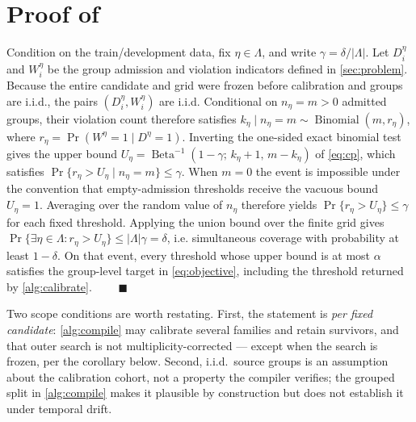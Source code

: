 \section{Proof of \texorpdfstring{}{Proposition 1}}
\label{app:proof}

Condition on the train/development data, fix $\eta\in\Lambda$, and write
$\gamma=\delta/|\Lambda|$. Let $D_i^\eta$ and $W_i^\eta$ be the group admission
and violation indicators defined in \cref{sec:problem}. Because the entire
candidate and grid were frozen before calibration and groups are i.i.d., the
pairs $(D_i^\eta,W_i^\eta)$ are i.i.d. Conditional on $n_\eta=m>0$ admitted
groups, their violation count therefore satisfies
$k_\eta\mid n_\eta=m\sim\operatorname{Binomial}(m,r_\eta)$, where
$r_\eta=\Pr(W^\eta=1\mid D^\eta=1)$. Inverting the one-sided exact binomial
test~\citep{clopper1934binomial} gives the upper bound
$U_\eta=\operatorname{Beta}^{-1}(1-\gamma;\,k_\eta+1,\,m-k_\eta)$ of
\cref{eq:cp}, which satisfies
$\Pr\{r_\eta > U_\eta \mid n_\eta=m\}\le\gamma$. When $m=0$ the event is
impossible under the convention that empty-admission thresholds receive the
vacuous bound $U_\eta=1$. Averaging over the random value of $n_\eta$ therefore
yields $\Pr\{r_\eta > U_\eta\}\le\gamma$ for each fixed threshold. Applying the
union bound over the finite grid gives
$\Pr\{\exists\eta\in\Lambda: r_\eta > U_\eta\}\le|\Lambda|\gamma=\delta$, i.e.
simultaneous coverage with probability at least $1-\delta$. On that event,
every threshold whose upper bound is at most $\alpha$ satisfies the group-level
target in \cref{eq:objective}, including the threshold returned by
\cref{alg:calibrate}. $\qquad\blacksquare$

Two scope conditions are worth restating. First, the statement is
\emph{per fixed candidate}: \cref{alg:compile} may calibrate several families
and retain survivors, and that outer search is not multiplicity-corrected ---
except when the search is frozen, per the corollary below. Second, i.i.d.\
source groups is an assumption about the calibration cohort, not a property
the compiler verifies; the grouped split in \cref{alg:compile} makes it
plausible by construction but does not establish it under temporal drift.

